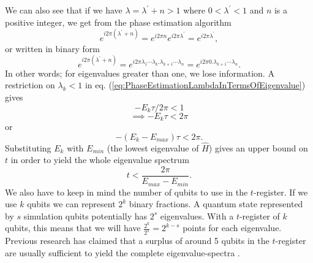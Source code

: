 We can also see that if we have $\lambda = \lambda^{'} + n > 1$ where $0 < \lambda^{'} < 1$ and $n$ is a positive integer, we get from the phase estimation algorithm 
$$e^{i2\pi (\lambda^{'} + n)} = e^{i2\pi n}e^{i2\pi \lambda^{'}} =e^{i2\pi \lambda^{'}}, $$
or written in binary form
$$e^{i2\pi (\lambda^{'} + n)} = e^{i2\pi \lambda_1\cdots\lambda_k.\lambda_{k+1}\cdots\lambda_n} = e^{i 2\pi 0.\lambda_{k+1}\cdots \lambda_n}.$$
In other words; for eigenvalues greater than one, we lose information.
A restriction on $\lambda_k < 1$ in eq. (\ref{eq:PhaseEstimationLambdaInTermsOfEigenvalue}) gives
$$-E_k \tau / 2\pi < 1 $$ 
$$\implies -E_k \tau < 2\pi $$
or
$$-(E_k - E_{max}) \tau < 2\pi. $$
Substituting $E_k$ with $E_{min}$ (the lowest eigenvalue of $\hat{H}$) gives an upper bound on $t$ in order to yield the whole eigenvalue spectrum
\begin{equation}
    \label{eq:PhaseEstimationtUpperBound}
    t < \frac{2\pi}{E_{max} - E_{min}}.
\end{equation}
We also have to keep in mind the number of qubits to use in the $t$-register. If we use $k$ qubits we can represent $2^k$ binary fractions. A quantum state represented by $s$ simulation qubits potentially has $2^s$ eigenvalues. With a $t$-register of $k$ qubits, this means that we will have $\frac{2^k}{2^s} = 2^{k-s}$ points for each eigenvalue.
Previous research has claimed that a surplus of around 5 qubits in the $t$-register are usually sufficient to yield the complete eigenvalue-spectra \cite{Ovrum2003QuantumCA}.

